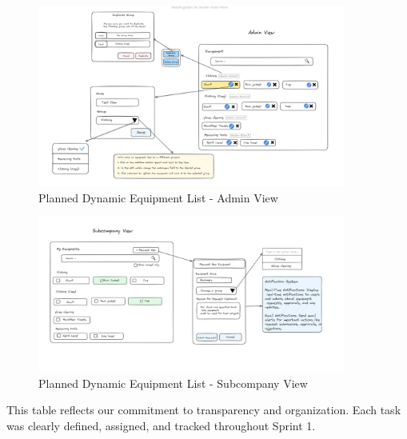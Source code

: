     \begin{figure}[H]
        \centering
        \includegraphics[width=0.9\textwidth]{src/assets/chapters/DynamicEquipementAdmin.PNG}
        \caption{Planned Dynamic Equipment List - Admin View}
        \label{fig:dynamic_equipment_list_admin}
    \end{figure}
    
    \begin{figure}[H]
        \centering
        \includegraphics[width=0.9\textwidth]{src/assets/chapters/DynamicEquipementSubcompany.PNG}
        \caption{Planned Dynamic Equipment List - Subcompany View}
        \label{fig:dynamic_equipment_list_subcompany}
    \end{figure}
    
This table reflects our commitment to transparency and organization. Each task was clearly defined, assigned, and tracked throughout Sprint 1.
